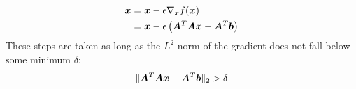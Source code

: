 \begin{multicols}{2}
	\begin{align*}
	\bol{x} &= \bol{x}-\epsilon \nabla_x f(\bol{x})\\
	&= \bol{x} -\epsilon \left(\bol{A}^T\bolA\bol{x}-\bolA^T\bol{b}\right)
	\end{align*}
	These steps are taken as long as the $L^2$ norm of the gradient does not fall below some minimum $\delta$:
	\[ \lVert \bolA^T\bol{Ax}-\bolA^T\bol{b}\rVert_2 > \delta \]


\end{multicols}
\newpage
